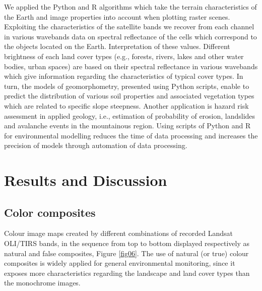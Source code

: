 \documentclass[algorithms,article,submit,pdftex,moreauthors]{Definitions/mdpi}
\begin{document}
We applied the Python and R algorithms which take the terrain characteristics of the Earth and image properties into account when plotting raster scenes. Exploiting the characteristics of the satellite bands we recover from each channel in various wavebands data on spectral reflectance of the cells which correspond to the objects located on the Earth. Interpretation of these values. Different brightness of each land cover types (e.g., forests, rivers, lakes and other water bodies, urban spaces) are based on their spectral reflectance in various wavebands which give information regarding the characteristics of typical cover types. In turn, the models of geomorphometry, presented using Python scripts, enable to predict the distribution of various soil properties and associated vegetation types which are related to specific slope steepness. Another application is  hazard risk assessment in applied geology, i.e., estimation of probability of erosion, landslides and avalanche events in the mountainous region. Using scripts of Python and R for environmental modelling reduces the time of data processing and increases the precision of models through automation of data processing.

\newpage
\section{Results and Discussion}
\subsection{Color composites}
Colour image maps created by different combinations of recorded Landsat OLI/TIRS bands, in the sequence from top to bottom displayed respectively as natural and false composites,  Figure \ref{fig06}. The use of natural (or true) colour composites is widely applied for general environmental monitoring, since it exposes more characteristics regarding the landscape and land cover types than the monochrome images. 
\end{document}
